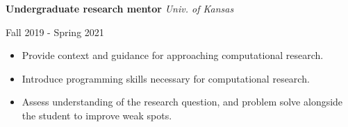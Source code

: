 \vspace{\y}
{\bf Undergraduate research mentor} \hfill \textit{Univ. of Kansas}

\hfill Fall 2019 - Spring 2021

\begin{itemize}[rightmargin=\dimexpr\linewidth-10cm-\leftmargin\relax,noitemsep,topsep=0cm]
\raggedright
  \item Provide context and guidance for approaching computational research.
  \item Introduce programming skills necessary for computational research.
  \item Assess understanding of the research question, and problem solve alongside the student to improve weak spots.
\end{itemize}

